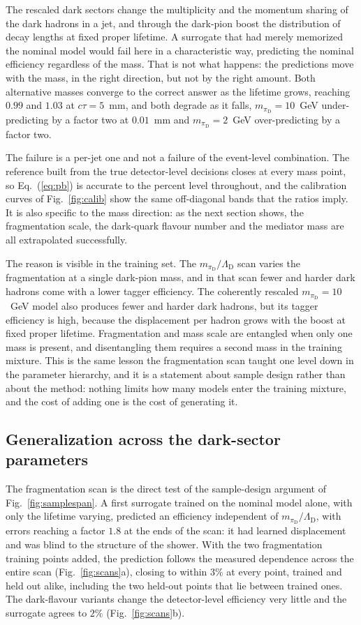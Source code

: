 \documentclass[a4paper,11pt]{article}
\newcommand{\ctau}{c\tau}
\newcommand{\pid}{\pi_{\mathrm{D}}}
\newcommand{\mpid}{m_{\pid}}
\begin{document}
The rescaled dark sectors change the multiplicity and the momentum
sharing of the dark hadrons in a jet, and through the dark-pion boost
the distribution of decay lengths at fixed proper lifetime. A surrogate
that had merely memorized the nominal model would fail here in a
characteristic way, predicting the nominal efficiency regardless of
the mass. That is not what happens: the predictions move with the mass,
in the right direction, but not by the right amount. Both alternative
masses converge to the correct answer as the lifetime grows, reaching
$0.99$ and $1.03$ at $\ctau = 5$~mm, and both degrade as it falls,
$\mpid = 10$~GeV under-predicting by a factor two at $0.01$~mm and
$\mpid = 2$~GeV over-predicting by a factor two.

The failure is a per-jet one and not a failure of the event-level
combination. The reference built from the true detector-level decisions
closes at every mass point, so Eq.~(\ref{eq:pb}) is accurate to the
percent level throughout, and the calibration curves of
Fig.~\ref{fig:calib} show the same off-diagonal bands that the ratios
imply. It is also specific to the mass direction: as the next section
shows, the fragmentation scale, the dark-quark flavour number and the
mediator mass are all extrapolated successfully.

The reason is visible in the training set. The
$\mpid/\Lambda_{\mathrm{D}}$ scan varies the fragmentation at a single
dark-pion mass, and in that scan fewer and harder dark hadrons come
with a lower tagger efficiency. The coherently rescaled
$\mpid = 10$~GeV model also produces fewer and harder dark hadrons,
but its tagger efficiency is high, because the displacement per hadron
grows with the boost at fixed proper lifetime. Fragmentation and mass
scale are entangled when only one mass is present, and disentangling
them requires a second mass in the training mixture. This is the same
lesson the fragmentation scan taught one level down in the parameter
hierarchy, and it is a statement about sample design rather than about
the method: nothing limits how many models enter the training mixture,
and the cost of adding one is the cost of generating it.

\subsection{Generalization across the dark-sector parameters}

The fragmentation scan is the direct test of the sample-design argument
of Fig.~\ref{fig:samplespan}. A first surrogate trained on the nominal
model alone, with only the lifetime varying, predicted an efficiency
independent of $\mpid/\Lambda_{\mathrm{D}}$, with errors reaching a
factor $1.8$ at the ends of the scan: it had learned displacement and
was blind to the structure of the shower. With the two fragmentation
training points added, the prediction follows the measured dependence
across the entire scan (Fig.~\ref{fig:scans}a), closing to within
$3\%$ at every point, trained and held out alike, including the two
held-out points that lie between trained ones. The dark-flavour
variants change the detector-level efficiency very little and the
surrogate agrees to $2\%$ (Fig.~\ref{fig:scans}b).
\end{document}
